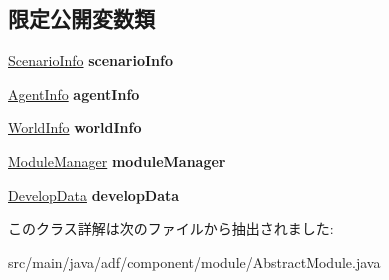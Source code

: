 \subsection*{限定公開変数類}
\begin{DoxyCompactItemize}
\item 
\hypertarget{classadf_1_1component_1_1module_1_1AbstractModule_a4f3c28aad990c2d969f06f0cd7955281}{}\label{classadf_1_1component_1_1module_1_1AbstractModule_a4f3c28aad990c2d969f06f0cd7955281} 
\hyperlink{classadf_1_1agent_1_1info_1_1ScenarioInfo}{Scenario\+Info} {\bfseries scenario\+Info}
\item 
\hypertarget{classadf_1_1component_1_1module_1_1AbstractModule_a7899d34c90df44723cdcb35653735a54}{}\label{classadf_1_1component_1_1module_1_1AbstractModule_a7899d34c90df44723cdcb35653735a54} 
\hyperlink{classadf_1_1agent_1_1info_1_1AgentInfo}{Agent\+Info} {\bfseries agent\+Info}
\item 
\hypertarget{classadf_1_1component_1_1module_1_1AbstractModule_a55634f32bad39f01c25258278fbc37aa}{}\label{classadf_1_1component_1_1module_1_1AbstractModule_a55634f32bad39f01c25258278fbc37aa} 
\hyperlink{classadf_1_1agent_1_1info_1_1WorldInfo}{World\+Info} {\bfseries world\+Info}
\item 
\hypertarget{classadf_1_1component_1_1module_1_1AbstractModule_a4e44edcd327e67f929c357b77b127f89}{}\label{classadf_1_1component_1_1module_1_1AbstractModule_a4e44edcd327e67f929c357b77b127f89} 
\hyperlink{classadf_1_1agent_1_1module_1_1ModuleManager}{Module\+Manager} {\bfseries module\+Manager}
\item 
\hypertarget{classadf_1_1component_1_1module_1_1AbstractModule_aa7337d08e34428dfc5baa9582c3d4444}{}\label{classadf_1_1component_1_1module_1_1AbstractModule_aa7337d08e34428dfc5baa9582c3d4444} 
\hyperlink{classadf_1_1agent_1_1develop_1_1DevelopData}{Develop\+Data} {\bfseries develop\+Data}
\end{DoxyCompactItemize}


このクラス詳解は次のファイルから抽出されました\+:\begin{DoxyCompactItemize}
\item 
src/main/java/adf/component/module/Abstract\+Module.\+java\end{DoxyCompactItemize}
